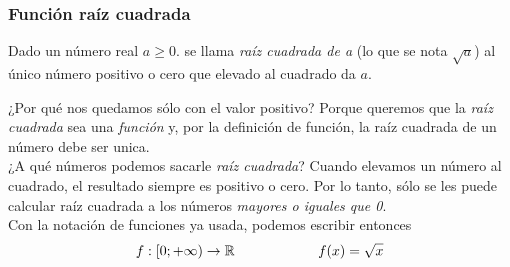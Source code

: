 \documentclass[../Teoría.root.tex]{subfiles}
\begin{document}
        \subsubsection{Función raíz cuadrada}
        Dado un número real \(a\geq0\). se llama \textit{raíz cuadrada de a} (lo que se nota \(\sqrt{a}\)) al único número positivo o cero que elevado al cuadrado da \(a\).
        \begin{center}
        \end{center}
        ¿Por qué nos quedamos sólo con el valor positivo? Porque queremos que la \textit{raíz cuadrada} sea una \textit{función} y, por la definición de función, la raíz cuadrada de un número debe ser unica.\\
        ¿A qué números podemos sacarle \textit{raíz cuadrada}? Cuando elevamos un número al cuadrado, el resultado siempre es positivo o cero. Por lo tanto, sólo se les puede calcular raíz cuadrada a los números \textit{mayores o iguales que 0}.\\
        Con la notación de funciones ya usada, podemos escribir entonces
        \[f:[0;+\infty)\rightarrow\mathbb{R} \qquad\qquad\qquad f(x)=\sqrt{x}\]
\end{document}

